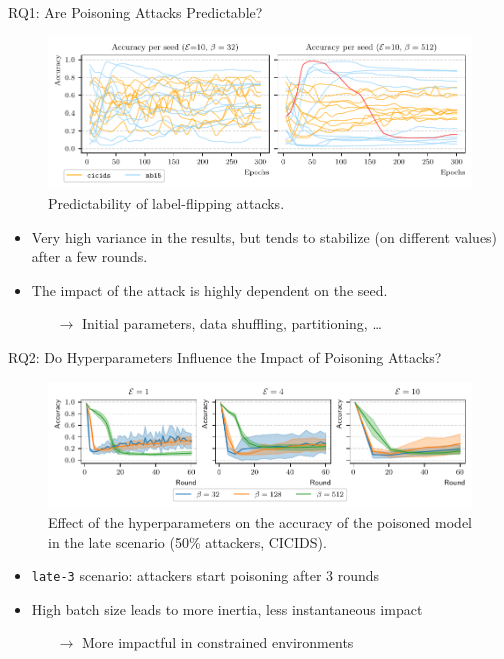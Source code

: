 \begin{frame}{RQ1: Are Poisoning Attacks Predictable?}

  \begin{figure}
    \centering
    \includegraphics[width=.8\textwidth]{figures/assessment/accuracy_per_seed.pdf}
    \caption{Predictability of label-flipping attacks.}
  \end{figure}

  \begin{itemize}
    \item Very high variance in the results, but tends to stabilize (on different values) after a few rounds.

    \item The impact of the attack is highly dependent on the seed.
    \begin{itemize}
      \item[$\rightarrow$] Initial parameters, data shuffling, partitioning, \dots
    \end{itemize}
  \end{itemize}


\end{frame}

\begin{frame}{RQ2: Do Hyperparameters Influence the Impact of Poisoning Attacks?}

  \begin{figure}
    \centering
    \includegraphics[width=\textwidth]{figures/assessment/hyperparams-late-icdcs.pdf}
    \caption{Effect of the hyperparameters on the accuracy of the poisoned
    model in the late scenario (50\% attackers, CICIDS).}
  \end{figure}

  \begin{itemize}
    \item \texttt{late-3} scenario: attackers start poisoning after 3 rounds
    \item High batch size leads to more inertia, less instantaneous impact
    \begin{itemize}
      \item[$\rightarrow$] More impactful in constrained environments
    \end{itemize}
  \end{itemize}

\end{frame}

